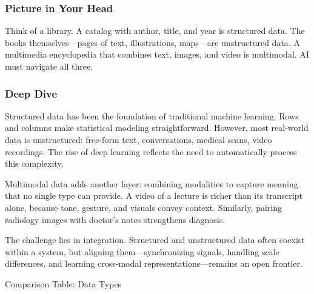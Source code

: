 \documentclass[
  letterpaper,
  DIV=11,
  numbers=noendperiod]{scrreprt}
\begin{document}
\subsubsection{Picture in Your Head}\label{picture-in-your-head-71}

Think of a library. A catalog with author, title, and year is structured
data. The books themselves---pages of text, illustrations, maps---are
unstructured data. A multimedia encyclopedia that combines text, images,
and video is multimodal. AI must navigate all three.

\subsubsection{Deep Dive}\label{deep-dive-71}

Structured data has been the foundation of traditional machine learning.
Rows and columns make statistical modeling straightforward. However,
most real-world data is unstructured: free-form text, conversations,
medical scans, video recordings. The rise of deep learning reflects the
need to automatically process this complexity.

Multimodal data adds another layer: combining modalities to capture
meaning that no single type can provide. A video of a lecture is richer
than its transcript alone, because tone, gesture, and visuals convey
context. Similarly, pairing radiology images with doctor's notes
strengthens diagnosis.

The challenge lies in integration. Structured and unstructured data
often coexist within a system, but aligning them---synchronizing
signals, handling scale differences, and learning cross-modal
representations---remains an open frontier.

Comparison Table: Data Types
\end{document}
